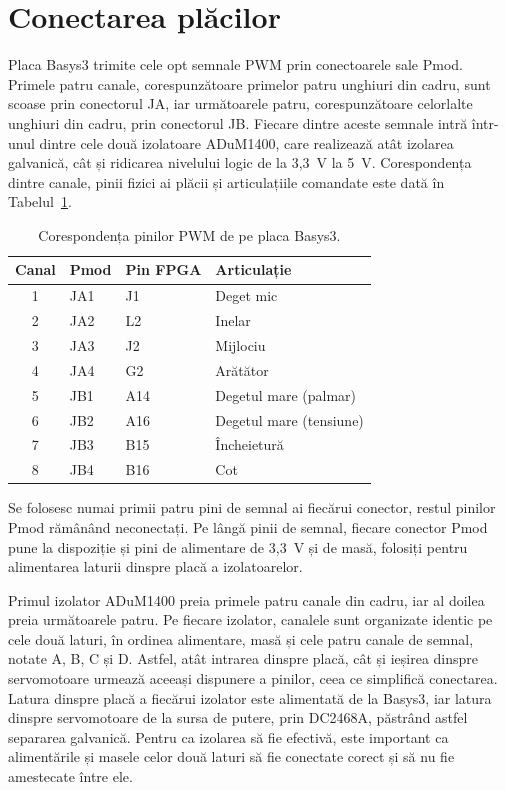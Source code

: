 \section{Conectarea plăcilor}
\label{sec:manual-conectare}

Placa Basys3 trimite cele opt semnale PWM prin conectoarele sale Pmod. Primele patru
canale, corespunzătoare primelor patru unghiuri din cadru, sunt scoase prin conectorul
JA, iar următoarele patru, corespunzătoare celorlalte unghiuri din cadru, prin
conectorul JB. Fiecare dintre aceste semnale intră într-unul dintre cele două
izolatoare ADuM1400, care realizează atât izolarea galvanică, cât și ridicarea nivelului
logic de la 3,3~V la 5~V. Corespondența dintre canale, pinii fizici ai plăcii și
articulațiile comandate este dată în Tabelul~\ref{tab:pini-pwm}.

\begin{table}[H]
\centering
\caption{Corespondența pinilor PWM de pe placa Basys3.}
\label{tab:pini-pwm}
\begin{tabular}{c l l l}
\toprule
\textbf{Canal} & \textbf{Pmod} & \textbf{Pin FPGA} & \textbf{Articulație} \\
\midrule
1 & JA1 & J1 & Deget mic \\
2 & JA2 & L2 & Inelar \\
3 & JA3 & J2 & Mijlociu \\
4 & JA4 & G2 & Arătător \\
5 & JB1 & A14 & Degetul mare (palmar) \\
6 & JB2 & A16 & Degetul mare (tensiune) \\
7 & JB3 & B15 & Încheietură \\
8 & JB4 & B16 & Cot \\
\bottomrule
\end{tabular}
\end{table}

Se folosesc numai primii patru pini de semnal ai fiecărui conector, restul pinilor
Pmod rămânând neconectați. Pe lângă pinii de semnal, fiecare conector Pmod pune la
dispoziție și pini de alimentare de 3,3~V și de masă, folosiți pentru alimentarea
laturii dinspre placă a izolatoarelor.

Primul izolator ADuM1400 preia primele patru canale din cadru, iar al doilea preia
următoarele patru. Pe fiecare izolator, canalele sunt organizate identic pe cele două
laturi, în ordinea alimentare, masă și cele patru canale de semnal, notate A, B, C și D.
Astfel, atât intrarea dinspre placă, cât și ieșirea dinspre servomotoare urmează aceeași
dispunere a pinilor, ceea ce simplifică conectarea. Latura dinspre placă a fiecărui
izolator este alimentată de la Basys3, iar latura dinspre servomotoare de la sursa de
putere, prin DC2468A, păstrând astfel separarea galvanică. Pentru ca izolarea să fie
efectivă, este important ca alimentările și masele celor două laturi să fie conectate
corect și să nu fie amestecate între ele.

